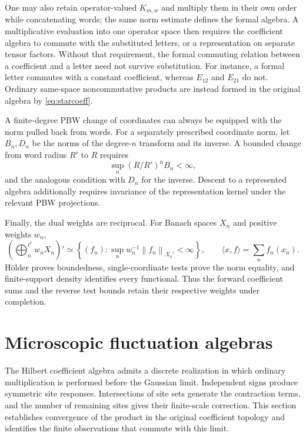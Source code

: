 \documentclass[11pt,a4paper]{amsart}
\numberwithin{equation}{section}
\theoremstyle{definition}
\theoremstyle{remark}
\newcommand{\norm}[1]{\left\lVert#1\right\rVert}
\begin{document}
One may also retain operator-valued $K_{m,w}$ and multiply them in their own order while concatenating words; the same norm estimate defines the formal algebra. A multiplicative evaluation into one operator space then requires the coefficient algebra to commute with the substituted letters, or a representation on separate tensor factors. Without that requirement, the formal commuting relation between a coefficient and a letter need not survive substitution. For instance, a formal letter commutes with a constant coefficient, whereas $E_{12}$ and $E_{21}$ do not. Ordinary same-space noncommutative products are instead formed in the original algebra by \eqref{eq:starcoeff}.

A finite-degree PBW change of coordinates can always be equipped with the norm pulled back from words. For a separately prescribed coordinate norm, let $B_n,D_n$ be the norms of the degree-$n$ transform and its inverse. A bounded change from word radius $R'$ to $R$ requires
\[
 \sup_n(R/R')^nB_n<\infty,
\]
and the analogous condition with $D_n$ for the inverse. Descent to a represented algebra additionally requires invariance of the representation kernel under the relevant PBW projections.

Finally, the dual weights are reciprocal. For Banach spaces $X_n$ and positive weights $w_n$,
\begin{equation}\label{eq:weighteddual}
 \left(\bigoplus_n^{\ell^1}w_nX_n\right)'
 \simeq\left\{(f_n):\sup_nw_n^{-1}\norm{f_n}_{X_n'}<\infty\right\},
 \qquad\langle x,f\rangle=\sum_nf_n(x_n).
\end{equation}
H\"older proves boundedness, single-coordinate tests prove the norm equality, and finite-support density identifies every functional. Thus the forward coefficient sums and the reverse test bounds retain their respective weights under completion.


\section{Microscopic fluctuation algebras}\label{sec:microscopic}
The Hilbert coefficient algebra admits a discrete realization in which ordinary multiplication is performed before the Gaussian limit. Independent signs produce symmetric site responses. Intersections of site sets generate the contraction terms, and the number of remaining sites gives their finite-scale correction. This section establishes convergence of the product in the original coefficient topology and identifies the finite observations that commute with this limit.
\end{document}
